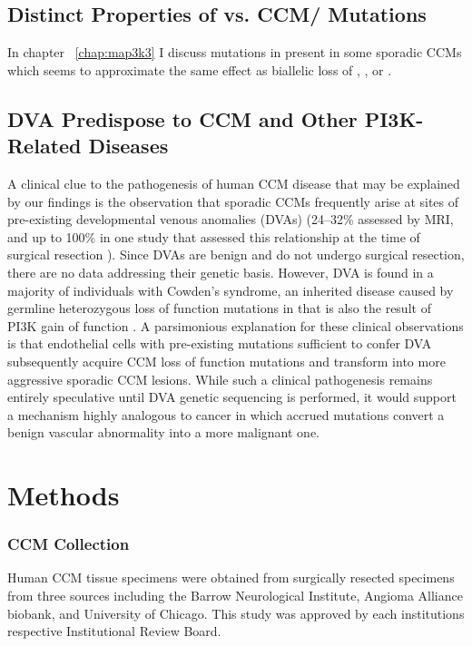 \subsection{Distinct Properties of  vs. CCM/ Mutations}
In chapter ~\ref{chap:map3k3} I discuss mutations in  present in some sporadic CCMs which seems to approximate the same effect as biallelic loss of , , or . 

\subsection{DVA Predispose to CCM and Other PI3K-Related Diseases}
A clinical clue to the pathogenesis of human CCM disease that may be explained by our findings is the observation that sporadic CCMs frequently arise at sites of pre-existing developmental venous anomalies (DVAs) (24--32\% assessed by MRI, and up to 100\% in one study that assessed this relationship at the time of surgical resection \citep{wurm2005, porter1999, abdulrauf1999}). Since DVAs are benign and do not undergo surgical resection, there are no data addressing their genetic basis.  However, DVA is found in a majority of individuals with Cowden’s syndrome, an inherited disease caused by germline heterozygous loss of function mutations in  that is also the result of PI3K gain of function \citep{dhamija2018, tan2007}.  A parsimonious explanation for these clinical observations is that endothelial cells with pre-existing  mutations sufficient to confer DVA subsequently acquire CCM loss of function mutations and transform into more aggressive sporadic CCM lesions.  While such a clinical pathogenesis remains entirely speculative until DVA genetic sequencing is performed, it would support a mechanism highly analogous to cancer in which accrued mutations convert a benign vascular abnormality into a more malignant one. 

\section{Methods}
\subsubsection{CCM Collection}
Human CCM tissue specimens were obtained from surgically resected specimens from three sources including the Barrow Neurological Institute, Angioma Alliance biobank, and University of Chicago. This study was approved by each institutions respective Institutional Review Board. 

